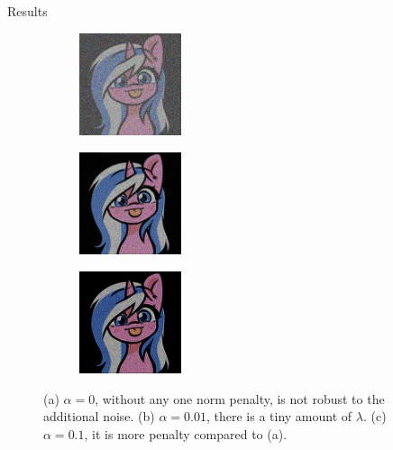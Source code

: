 \documentclass[11pt]{beamer}
\begin{document}
        \begin{frame}{Results}
            \begin{figure}[H]
                \centering
                \begin{subfigure}{3.5cm}
                    \includegraphics[width=3cm]{inverse_linear_experiment1-soln_img.jpg}
                    \caption{} \label{fig:1a}
                \end{subfigure}     %
                \begin{subfigure}{3.5cm}
                    \includegraphics[width=3cm]{inverse_linear_experiment2-soln_img.jpg}
                    \caption{} \label{fig:1b}
                \end{subfigure}     %
                \begin{subfigure}{3.5cm}
                    \includegraphics[width=3cm]{inverse_linear_experiment3-soln_img.jpg}
                    \caption{} \label{fig:1c}
                \end{subfigure}
                \caption{(a) $\alpha = 0$, without any one norm penalty, is not robust to the additional noise. (b) $\alpha = 0.01$, there is a tiny amount of $\lambda$. (c) $\alpha = 0.1$, it is more penalty compared to (a).}
                \label{fig:alto_deblurred}
            \end{figure}
        \end{frame}
        
\end{document}
